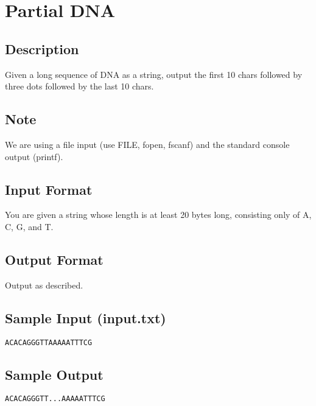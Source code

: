 

\begin{center}\end{center}
\vspace{5mm}


\section{Partial DNA}

\subsection*{Description}
Given a long sequence of DNA as a string, output the first 10 chars followed by three dots followed by the last 10 chars. 

\subsection*{Note}
We are using a file input (use FILE, fopen, fscanf) and the standard console output (printf).

\subsection*{Input Format}
You are given a string whose length is at least 20 bytes long, consisting only of A, C, G, and T.

\subsection*{Output Format}
Output as described.

\subsection*{Sample Input (input.txt)}
\begin{verbatim}
ACACAGGGTTAAAAATTTCG
\end{verbatim}

\subsection*{Sample Output}
\begin{verbatim}
ACACAGGGTT...AAAAATTTCG
\end{verbatim}

